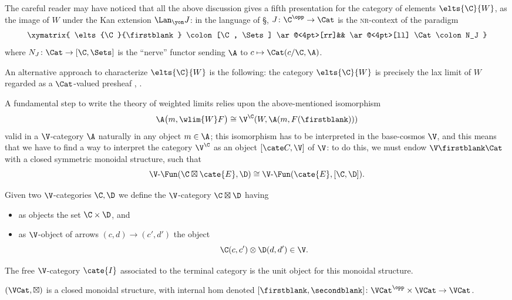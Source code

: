 \begin{remark}\label{its.another.nerve}
The careful reader may have noticed that all the above discussion gives a fifth presentation for the category of elements $\elts{\C}{W}$, as the image of $W$ under the Kan extension $\Lan_\yon J$: in the language of \S{}, $J\colon \C^\opp\to \Cat$ is the \textsc{nr}-context of the paradigm
\[
\xymatrix{
\elts{\C}{\firstblank} \colon [\C, \Sets]  \ar@<4pt>[rr]&& \ar@<4pt>[ll] \Cat\colon N_J
}
\]
where $N_J\colon \Cat \to  [\C, \Sets] $ is the ``nerve'' functor sending $\A$ to $c\mapsto \Cat(c/\C, \A)$.
\end{remark}
\begin{remark}
An alternative approach to characterize $\elts{\C}{W}$ is the following: the category $\elts{\C}{W}$ is precisely the lax limit of $W$ regarded as a $\Cat$-valued presheaf \cite[\S\textbf{4}]{2catlimits}, \cite{Graya,Street19}.
\end{remark}
A fundamental step to write the theory of weighted limits relies upon the above-mentioned isomorphism
\[
\A\big(m,\wlim{W}F\big) \cong \V^{\C}(W, \A(m,F(\firstblank)))
\]
valid in a $\V$-category $\A$ naturally in any object $m\in\A$; this isomorphism has to be interpreted in the base-cosmos $\V$, and this means that we have to find a way to interpret the category $\V^\C$ as an object $[\cate C,{\V}]$ of $\V$: to do this, we must endow $\V\text{\firstblank}\Cat$ with a closed symmetric monoidal structure, such that
\[\label{closurenrich}
\V\text{-}\Fun(\C\boxtimes \cate{E}, \D) \cong 
\V\text{-}\Fun(\cate{E}, [\C,\D]).
\]
\begin{definition}\label{cosmuclosed}
Given two $\V$-categories $\C, \D$ we define the $\V$-category $\C\boxtimes\D$ having
\begin{itemize}
\item as objects the set $\C\times\D$, and 
\item as $\V$-object of arrows $(c,d)\to (c',d')$ the object
\[
\C(c,c')\otimes \D(d,d')\in\V.
\]
\end{itemize}
The free $\V$-category $\cate{I}$ associated to the terminal category is the unit object for this monoidal structure.
\end{definition}
\begin{proposition}
$(\VCat,\boxtimes)$ is a closed monoidal structure, with internal hom denoted $[\firstblank,\secondblank]\colon \VCat^\opp\times \VCat \to \VCat$.
\end{proposition} 
